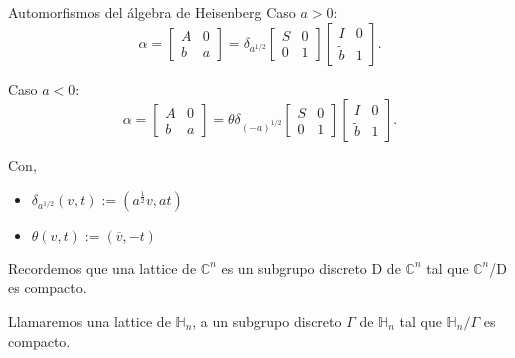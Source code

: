 \documentclass{beamer}
\begin{document}
\begin{frame}{Automorfismos del álgebra de Heisenberg}
Caso $a>0$:
 $$\alpha=
 \begin{bmatrix}
A & 0\\
b & a
\end{bmatrix}=
\delta_{a^{1/2}}
\begin{bmatrix}
S & 0\\
0 & 1
\end{bmatrix}
\begin{bmatrix}
I & 0\\
\tilde{b} & 1
\end{bmatrix}.
$$

Caso $a<0$:
$$\alpha=
 \begin{bmatrix}
A & 0\\
b & a
\end{bmatrix}=
\theta
\delta_{(-a)^{1/2}}
\begin{bmatrix}
S & 0\\
0 & 1
\end{bmatrix}
\begin{bmatrix}
I & 0\\
\tilde{b} & 1
\end{bmatrix}.
$$

Con, 
\begin{itemize}
\item $\delta_{a^{1/2}} (v,t) :=(a^\frac{1}{2} v,a t)$
\item $\theta(v,t):=(\overline{v},-t)$
\end{itemize}
\end{frame}

\begin{frame}
 \begin{definition}
 Recordemos que una lattice de $\mathbb{C}^n$ es un subgrupo discreto D de $\mathbb{C}^n$ tal que $\mathbb{C}^n$/D es compacto.
\end{definition}

\begin{definition}
 Llamaremos una lattice de $\mathbb{H}_n$, a un subgrupo discreto $\Gamma$ de $\mathbb{H}_n$ tal que $\mathbb{H}_n/\Gamma$ es compacto.
\end{definition}

\end{frame}
\end{document}

